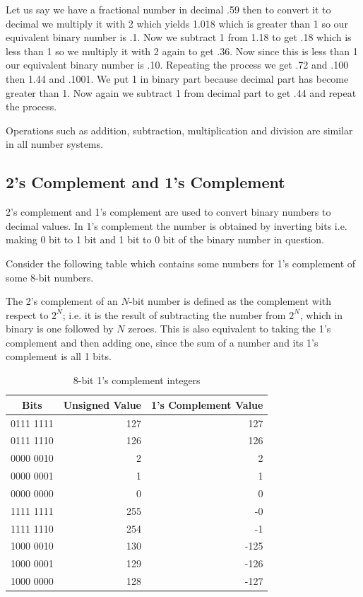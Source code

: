 Let us say we have a fractional number in decimal .59 then to convert it to
decimal we multiply it with 2 which yields 1.018 which is greater than 1 so our
equivalent binary number is .1. Now we subtract 1 from 1.18 to get .18 which
is less than 1 so we multiply it with 2 again to get .36. Now since this is
less than 1 our equivalent binary number is .10. Repeating the process we get
.72 and .100 then 1.44 and .1001. We put 1 in binary part because decimal part
has become greater than 1. Now again we subtract 1 from decimal part to get .44
and repeat the process.

Operations such as addition, subtraction, multiplication and division are
similar in all number systems.

\subsection{2's Complement and 1's Complement}
2's complement and 1's complement are used to convert binary numbers to decimal
values. In 1's complement the number is obtained by inverting bits i.e. making
0 bit to 1 bit and 1 bit to 0 bit of the binary number in question.

Consider the following table which contains some numbers for 1's complement
of some 8-bit numbers.

The 2's complement of an $N$-bit number is defined as the complement with
respect to $2^N$; i.e. it is the result of subtracting the number
from $2^N$, which in binary is one followed by $N$ zeroes. This is also
equivalent to taking the 1's complement and then adding one, since the sum of
a number and its 1's complement is all 1 bits.



\begin{table}[H]
 \begin{center}
 \caption{8-bit 1's complement integers}
\begin{tabular}{|c|r|r|}
\hline
\textbf{Bits}&\textbf{Unsigned Value}&\textbf{1's Complement Value}\\
\hline
0111 1111&127&127\\
\hline
0111 1110&126&126\\
\hline
0000 0010&2&2\\
\hline
0000 0001&1&1\\
\hline
0000 0000&0&0\\
\hline
1111 1111&255&-0\\
\hline
1111 1110&254&-1\\
\hline
1000 0010&130&-125\\
\hline
1000 0001&129&-126\\
\hline
1000 0000&128&-127\\
\hline
\end{tabular}
\end{center}
\end{table}

